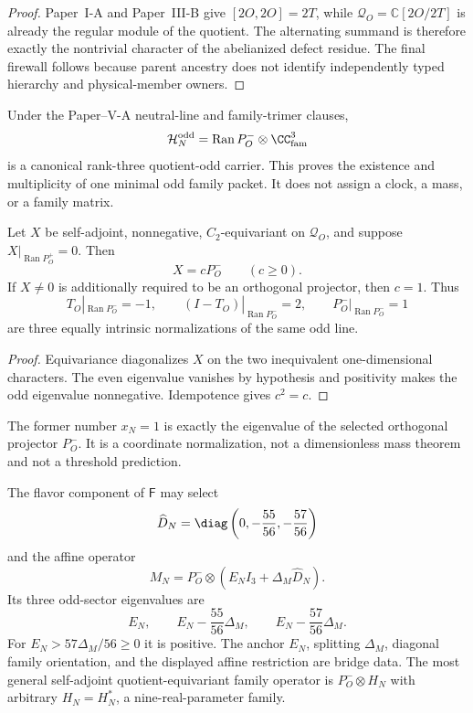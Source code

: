 \documentclass[12pt,a4paper]{article}
\newcommand{\Ran}{\operatorname{Ran}}
\begin{document}
\begin{proof}
Paper~I-A and Paper~III-B give $[2O,2O]=2T$, while
$\mathcal Q_O=\mathbb C[2O/2T]$ is already the regular module of the quotient.
The alternating summand is therefore exactly the nontrivial character of the
abelianized defect residue.  The final firewall follows because parent
ancestry does not identify independently typed hierarchy and physical-member
owners.
\end{proof}

\begin{corollary}
\label{p6:cor:rank-three-heavy-carrier}
Under the Paper--V-A neutral-line and family-trimer clauses,
\[
\mathcal H_N^{\rm odd}
=
\Ran P_O^-\otimes\CC^3_{\rm fam}
\]
is a canonical rank-three quotient-odd carrier.  This proves the existence
and multiplicity of one minimal odd family packet.  It does not assign a
clock, a mass, or a family matrix.
\end{corollary}

\begin{theorem}
\label{p6:thm:quotient-operator-classification}
Let \(X\) be self-adjoint, nonnegative, \(C_2\)-equivariant on
\(\mathcal Q_O\), and suppose \(X|_{\Ran P_O^+}=0\).  Then
\[
X=cP_O^-
\qquad(c\ge0).
\]
If \(X\ne0\) is additionally required to be an orthogonal projector, then
\(c=1\).  Thus
\[
T_O|_{\Ran P_O^-}=-1,\qquad
(I-T_O)|_{\Ran P_O^-}=2,\qquad
P_O^-|_{\Ran P_O^-}=1
\]
are three equally intrinsic normalizations of the same odd line.
\end{theorem}

\begin{proof}
Equivariance diagonalizes \(X\) on the two inequivalent one-dimensional
characters.  The even eigenvalue vanishes by hypothesis and positivity makes
the odd eigenvalue nonnegative.  Idempotence gives \(c^2=c\).
\end{proof}

\begin{corollary}[Meaning of \(x_N=1\)]
\label{p6:cor:heavy-projector-normalization}
The former number \(x_N=1\) is exactly the eigenvalue of the selected
orthogonal projector \(P_O^-\).  It is a coordinate normalization, not a
dimensionless mass theorem and not a threshold prediction.
\end{corollary}

\begin{definition}
\label{p6:def:heavy-family-operator}
The flavor component of \(\mathsf F\) may select
\[
\widehat D_N
=
\diag\left(0,-\frac{55}{56},-\frac{57}{56}\right)
\]
and the affine operator
\[
\boxed{
M_N
=
P_O^-\otimes
\left(E_NI_3+\Delta_M\widehat D_N\right).
}
\]
Its three odd-sector eigenvalues are
\[
E_N,\qquad
E_N-\frac{55}{56}\Delta_M,\qquad
E_N-\frac{57}{56}\Delta_M.
\]
For \(E_N>57\Delta_M/56\ge0\) it is positive.  The anchor \(E_N\), splitting
\(\Delta_M\), diagonal family orientation, and the displayed affine
restriction are bridge data.  The most general self-adjoint
quotient-equivariant family operator is \(P_O^-\otimes H_N\) with arbitrary
\(H_N=H_N^*\), a nine-real-parameter family.
\end{definition}
\end{document}

